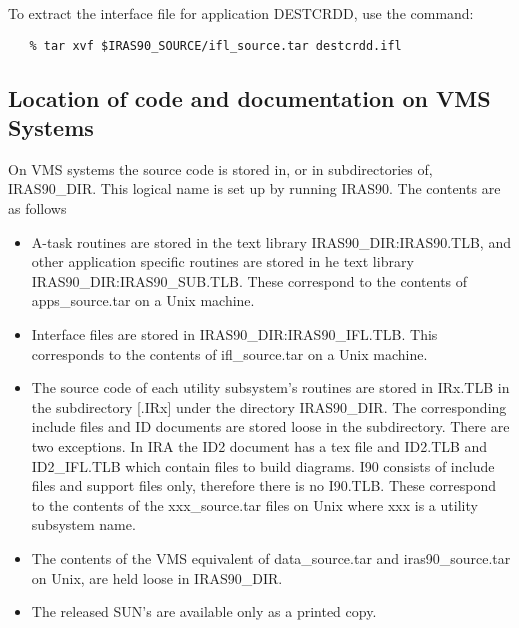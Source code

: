 To extract the interface file for application {\small DESTCRDD}, use the
command: 

\small
\begin{verbatim}
   % tar xvf $IRAS90_SOURCE/ifl_source.tar destcrdd.ifl 
\end{verbatim}
\normalsize

\subsection{Location of code and documentation on VMS Systems}
\label{SEC:VMSS} 

On {\small VMS} systems the source code is stored in, or in subdirectories of,
{\small IRAS90\_DIR}. This logical name is set up by running {\small IRAS90}.
The contents are as follows

\begin{itemize}

\item A-task routines are stored in the text library
{\small IRAS90\_DIR:IRAS90.TLB}, and other application specific
routines are stored in he text library {\small
IRAS90\_DIR:IRAS90\_SUB.TLB}. These correspond to the contents of 
apps\_source.tar on a Unix machine.

\item Interface files are stored in {\small IRAS90\_DIR:IRAS90\_IFL.TLB}.
This corresponds to the contents of ifl\_source.tar on a Unix machine.

\item The source code of each utility subsystem's  routines are stored
in IRx.TLB  in the subdirectory [.IRx] under the directory IRAS90\_DIR.
The corresponding include files and {\small ID} documents are stored loose
in the subdirectory. There are two exceptions. In {\small IRA} the {\small ID2}
document has a tex file and {\small ID2.TLB} and {\small ID2\_IFL.TLB} which
contain files to build diagrams. {\small I90} consists of include files
and support files only, therefore there is no {\small I90.TLB}.  These
correspond to the contents of the xxx\_source.tar files on Unix where xxx is a
utility subsystem name.

\item The contents of the VMS equivalent of data\_source.tar and 
iras90\_source.tar on Unix, are held loose in {\small IRAS90\_DIR}.

\item The released SUN's are available only as a printed copy.

\end{itemize}



